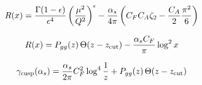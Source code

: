 \begin{equation}
  R(x) = \frac{\Gamma(1-\epsilon)}{\epsilon^{4}} \left(\frac{\mu^2}{Q^2}\right)^{\epsilon} - \frac{\alpha_s}{4\pi} \left( C_F C_A \zeta_{2} - \frac{C_A}{2} \frac{\pi^2}{6} \right)
  \label{eq:4}
\end{equation}

\begin{equation}
  R(x) = P_{gg}(z) \, \Theta(z - z_{\rm cut}) - \frac{\alpha_s C_F}{\pi} \log^2 x
  \label{eq:5}
\end{equation}

\begin{equation}
  \gamma_{\rm cusp}(\alpha_s) = \frac{\alpha_s}{2\pi} C_F^2 \log^{4} \frac{1}{z} + P_{gg}(z) \, \Theta(z - z_{\rm cut})
  \label{eq:6}
\end{equation}

